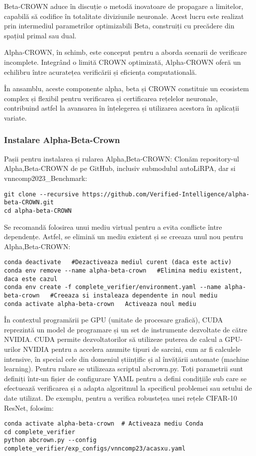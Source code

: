 \documentclass[12pt,a4paper]{article}
\begin{document}
Beta-CROWN aduce în discuție o metodă inovatoare de propagare a limitelor, capabilă să codifice în totalitate diviziunile neuronale. Acest lucru este realizat prin intermediul parametrilor optimizabili Beta, construiți cu precădere din spațiul primal sau dual. 

Alpha-CROWN, în schimb, este conceput pentru a aborda scenarii de verificare incomplete. Integrând o limită CROWN optimizată, Alpha-CROWN oferă un echilibru între acuratețea verificării și eficiența computatională.

În ansamblu, aceste componente alpha, beta și CROWN constituie un ecosistem complex și flexibil pentru verificarea și certificarea rețelelor neuronale, contribuind astfel la avansarea în înțelegerea și utilizarea acestora în aplicații variate.
\subsubsection{Instalare Alpha-Beta-Crown}
Pașii pentru instalarea și rularea Alpha,Beta-CROWN:
Clonăm repository-ul Alpha,Beta-CROWN de pe GitHub, inclusiv submodulul autoLiRPA, dar si vnncomp2023\_Benchmark:
\begin{lstlisting}
git clone --recursive https://github.com/Verified-Intelligence/alpha-beta-CROWN.git
cd alpha-beta-CROWN
\end{lstlisting}
Se recomandă folosirea unui mediu virtual pentru a evita conflicte între dependențe. Astfel, se elimină un mediu existent și se creeaza unul nou pentru Alpha,Beta-CROWN:
\begin{lstlisting}
conda deactivate   #Dezactiveaza mediul curent (daca este activ)
conda env remove --name alpha-beta-crown   #Elimina mediu existent, daca este cazul
conda env create -f complete_verifier/environment.yaml --name alpha-beta-crown   #Creeaza si instaleaza dependente in noul mediu
conda activate alpha-beta-crown   Activeaza noul mediu
\end{lstlisting}
În contextul programării pe GPU (unitate de procesare grafică), CUDA reprezintă un model de programare și un set de instrumente dezvoltate de către NVIDIA. CUDA permite dezvoltatorilor să utilizeze puterea de calcul a GPU-urilor NVIDIA pentru a accelera anumite tipuri de sarcini, cum ar fi calculele intensive, în special cele din domeniul științific și al învățării automate (machine learning).
Pentru rulare se utilizeaza scriptul abcrown.py. Toți parametrii sunt definiți într-un fișier de configurare YAML pentru a defini condițiile sub care se efectuează verificarea și a adapta algoritmul la specificul problemei sau setului de date utilizat. De exemplu, pentru a verifica robustețea unei rețele CIFAR-10 ResNet, folosim:
\begin{lstlisting}
conda activate alpha-beta-crown  # Activeaza mediu Conda
cd complete_verifier
python abcrown.py --config complete_verifier/exp_configs/vnncomp23/acasxu.yaml
\end{lstlisting}
\end{document}
